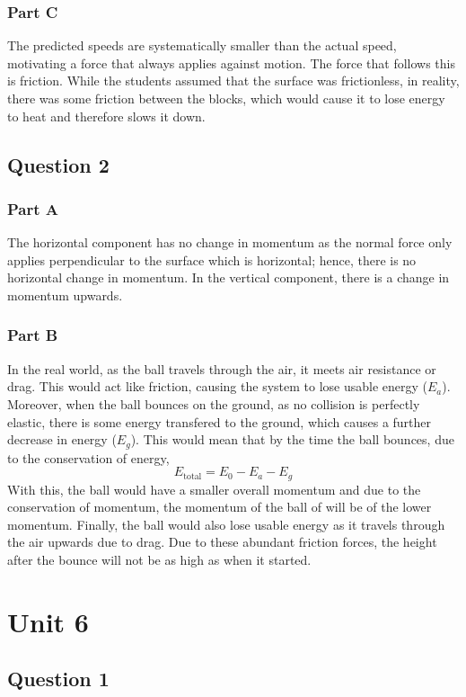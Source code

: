 \documentclass[]{scrartcl}
\begin{document}
\subsubsection*{Part C}
  The predicted speeds are systematically smaller than the actual speed, motivating a force that always applies against motion. The force that follows this is friction. While the students assumed that the surface was frictionless, in reality, there was some friction between the blocks, which would cause it to lose energy to heat and therefore slows it down.
\subsection*{Question 2}
\subsubsection*{Part A}
  The horizontal component has no change in momentum as the normal force only applies perpendicular to the surface which is horizontal; hence, there is no horizontal change in momentum. In the vertical component, there is a change in momentum upwards.
\subsubsection*{Part B}
  In the real world, as the ball travels through the air, it meets air resistance or drag. This would act like friction, causing the system to lose usable energy ($E_a$). Moreover, when the ball bounces on the ground, as no collision is perfectly elastic, there is some energy transfered to the ground, which causes a further decrease in energy ($E_g$). This would mean that by the time the ball bounces, due to the conservation of energy,
  $$E_{\textrm{total}} = E_0 - E_a - E_g$$
  With this, the ball would have a smaller overall momentum and due to the conservation of momentum, the momentum of the ball of will be of the lower momentum. Finally, the ball would also lose usable energy as it travels through the air upwards due to drag. Due to these abundant friction forces, the height after the bounce will not be as high as when it started.

\section*{Unit 6}
\subsection*{Question 1}
\end{document}
